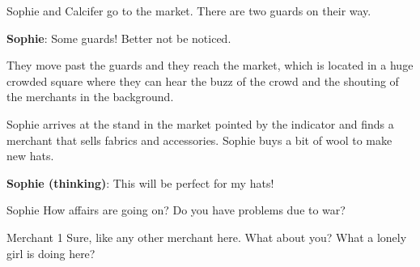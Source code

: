 Sophie and Calcifer go to the market. There are two guards on their way.

\textbf{Sophie}: Some guards! Better not be noticed.

They move past the guards and they reach the market, which is located in a huge crowded square where they can hear the buzz of the crowd and the shouting of the merchants in the background.


Sophie arrives at the stand in the market pointed by the indicator and finds a merchant that sells fabrics and accessories.
Sophie buys a bit of wool to make new hats.

\textbf{Sophie (thinking)}: This will be perfect for my hats!

\begin{screenplay}

\begin{dialogue}{Sophie}
How affairs are going on? Do you have problems due to war?
\end{dialogue}

\begin{dialogue}[resigned]{Merchant 1}
Sure, like any other merchant here. What about you? What a lonely girl is doing here?
\end{dialogue}

\end{screenplay}

